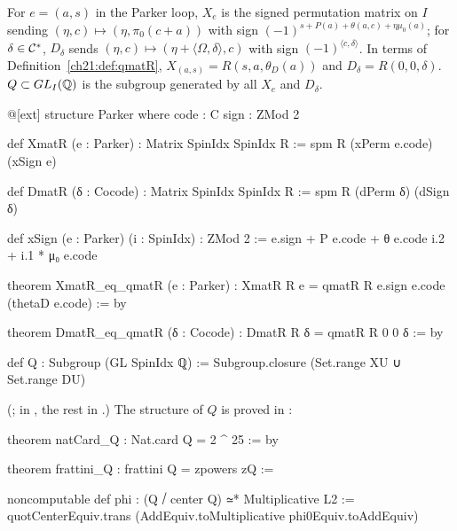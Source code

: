 \begin{definition}\label{ch21:def:Q}
For $e=(a,s)$ in the Parker loop, $X_e$ is the signed permutation matrix on $I$ sending
$(\eta,c)\mapsto(\eta,\pi_0(c+a))$ with sign $(-1)^{s+P(a)+\theta(a,c)+\eta\mu_0(a)}$; for
$\delta\in\mathcal{C}^*$, $D_\delta$ sends $(\eta,c)\mapsto(\eta+\langle\Omega,\delta\rangle,c)$ with sign
$(-1)^{\langle c,\delta\rangle}$.  In terms of Definition~\ref{ch21:def:qmatR},
$X_{(a,s)}=R(s,a,\theta_D(a))$ and $D_\delta=R(0,0,\delta)$.  $Q\subset GL_I({\mathbb{Q}})$ is the subgroup
generated by all $X_e$ and $D_\delta$.
\end{definition}
\begin{leancode}
@[ext] structure Parker where
  code : C
  sign : ZMod 2
\end{leancode}
\begin{leancode}
def XmatR (e : Parker) : Matrix SpinIdx SpinIdx R := spm R (xPerm e.code) (xSign e)

def DmatR (δ : Cocode) : Matrix SpinIdx SpinIdx R := spm R (dPerm δ) (dSign δ)
\end{leancode}
\begin{leancode}
def xSign (e : Parker) (i : SpinIdx) : ZMod 2 :=
  e.sign + P e.code + θ e.code i.2 + i.1 * μ₀ e.code
\end{leancode}
\begin{leancode}
theorem XmatR_eq_qmatR (e : Parker) : XmatR R e = qmatR R e.sign e.code (thetaD e.code) := by
\end{leancode}
\begin{leancode}
theorem DmatR_eq_qmatR (δ : Cocode) : DmatR R δ = qmatR R 0 0 δ := by
\end{leancode}
\begin{leancode}
def Q : Subgroup (GL SpinIdx ℚ) := Subgroup.closure (Set.range XU ∪ Set.range DU)
\end{leancode}
(;  in , the rest in
.)  The structure of $Q$ is proved in :
\begin{leancode}
theorem natCard_Q : Nat.card Q = 2 ^ 25 := by
\end{leancode}
\begin{leancode}
theorem frattini_Q : frattini Q = zpowers zQ :=
\end{leancode}
\begin{leancode}
noncomputable def phi : (Q ⧸ center Q) ≃* Multiplicative L2 :=
  quotCenterEquiv.trans (AddEquiv.toMultiplicative phi0Equiv.toAddEquiv)
\end{leancode}
